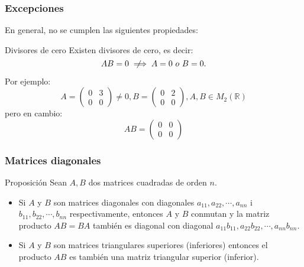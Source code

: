 \documentclass[aspectratio=169]{beamer}
\newcommand{\notimplies}{%
  \mathrel{{\ooalign{\hidewidth$\not\phantom{=}$\hidewidth\cr$\implies$}}}}
\begin{document}
 
         \begin{frame}
  \frametitle{Excepciones}
  En general, \alert<1>{no se cumplen} las siguientes propiedades:
  
   \begin{block}{Divisores de cero}
Existen divisores de cero, es decir:
\[AB=0 \notimplies A = 0 \ o \ B = 0.\]
\end{block}
Por ejemplo:
\[A = \left(\begin{array}{cc}0 & 3\\0 & 0\end{array}\right)\neq 0, B = \left(\begin{array}{cc}0 & 2 \\0 & 0\end{array}\right), A,B  \in M_2(\mathbb{R}) \]
pero en cambio:
\[AB = \left(\begin{array}{cc}0 & 0\\0 & 0\end{array}\right) \]

 \end{frame} 
 
          \begin{frame}
  \frametitle{Matrices diagonales}
  
   \begin{block}{Proposici\'on}
Sean $A,B$ dos matrices cuadradas de orden $n$.
\begin{itemize}
\item Si $A$ y $B$ son matrices diagonales con diagonales $a_{11},a_{22},\cdots,a_{nn}$ i $b_{11},b_{22},\cdots,b_{nn}$ respectivamente, entonces $A$ y $B$ conmutan y la matriz producto $AB = BA$ tambi\'en es diagonal con diagonal $a_{11}b_{11}, a_{22}b_{22},\cdots, a_{nn}b_{nn}$.
\item Si $A$ y $B$ son matrices triangulares superiores (inferiores) entonces el producto $AB$ es tambi\'en una matriz triangular superior (inferior).
\end{itemize}
\end{block}
 \end{frame} 
 
\end{document}
